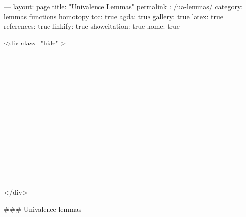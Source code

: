 ---
layout: page
title: "Univalence Lemmas"
permalink : /ua-lemmas/
category: lemmas functions homotopy
toc: true
agda: true
gallery: true
latex: true
references: true
linkify: true
showcitation: true
home: true
---

<div class="hide" >
\begin{code}%
\>[0]\AgdaSymbol{\{-\#}\AgdaSpace{}%
\AgdaSpace{}%
\AgdaSpace{}%
\AgdaSymbol{\#-\}}\<%
\\
\>[0]\AgdaSpace{}%
\AgdaModule{\AgdaUnderscore{}}\AgdaSpace{}%
\<%
\\
\>[0]\AgdaSpace{}%
\AgdaSpace{}%
\<%
\\
\>[0]\AgdaSpace{}%
\AgdaSpace{}%
\<%
\\
%
\\[\AgdaEmptyExtraSkip]%
\>[0]\AgdaSpace{}%
\AgdaSpace{}%
\<%
\\
\>[0]\AgdaSpace{}%
\AgdaSpace{}%
\<%
\\
%
\\[\AgdaEmptyExtraSkip]%
\>[0]\AgdaSpace{}%
\AgdaSpace{}%
\<%
\\
\>[0]\AgdaSpace{}%
\AgdaSpace{}%
\<%
\\
\>[0]\AgdaSpace{}%
\AgdaSpace{}%
\<%
\\
\>[0]\AgdaSpace{}%
\AgdaSpace{}%
\<%
\\
%
\\[\AgdaEmptyExtraSkip]%
\>[0]\AgdaSpace{}%
\AgdaSpace{}%
\<%
\end{code}
</div>

### Univalence lemmas

\begin{code}%
\>[0]\AgdaSpace{}%
\AgdaSpace{}%
\AgdaSymbol{\{}\AgdaSymbol{\}}\AgdaSpace{}%
\<%
\end{code}

